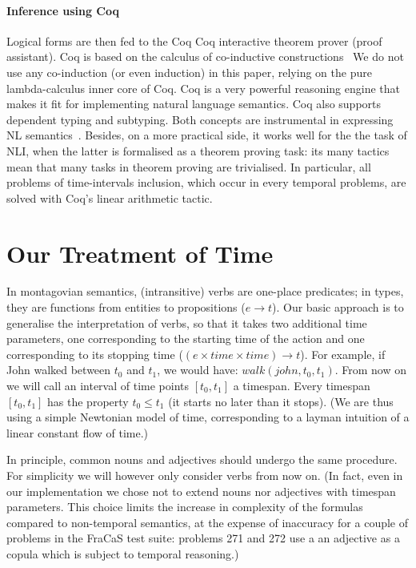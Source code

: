 \documentclass[a4paper,twoside]{article}
\begin{document}
\paragraph{Inference using Coq}
Logical forms are then fed to the Coq
Coq interactive theorem prover (proof assistant). Coq is based on
the calculus of co-inductive constructions~\citep{werner_une_1994} We
do not use any co-induction (or even induction) in this paper, relying
on the pure lambda-calculus inner core of Coq.  Coq is a very powerful
reasoning engine that makes it fit for implementing natural language
semantics.  Coq also supports  dependent typing and 
 subtyping. Both concepts are instrumental in expressing NL
semantics~\citep{chatzikyriakidis_natural_2014}.  Besides, on a more
practical side, it works well for the the task of NLI, when the latter
is formalised as a theorem proving task: its many tactics mean that
many tasks in theorem proving are trivialised. In particular, all
problems of time-intervals inclusion, which occur in every temporal
problems, are solved with Coq's linear arithmetic tactic.

\section{Our Treatment of Time}
\label{sec:our-semantics}

In montagovian semantics, (intransitive) verbs are one-place
predicates; in types, they are functions from entities to propositions
($e \to t$).  Our basic approach is to generalise the interpretation of 
verbs, so that it takes two
additional time parameters, one corresponding to the starting time
of the action and one corresponding to its stopping time ($(e × time × time) \to t$). For example,
if John walked between $t_0$ and $t_1$, we would have:
$walk(john,t_0,t_1)$. From now on we will call an interval of time
points $[t_0,t_1]$ a timespan. Every timespan $[t_0,t_1]$ has the
property $t_0 ≤ t_1$ (it starts no later than it stops). (We are thus
using a simple Newtonian model of time, corresponding to a layman
intuition of a linear constant flow of time.)

In principle, common nouns and adjectives should undergo the same
procedure. For simplicity we will however only consider verbs from now
on. (In fact, even in our implementation we chose not to extend nouns
nor adjectives with timespan parameters. This choice limits the
increase in complexity of the formulas compared to non-temporal
semantics, at the expense of inaccuracy for a couple of problems in
the FraCaS test suite: problems 271 and 272 use a an adjective as a
copula which is subject to temporal reasoning.)
\end{document}
